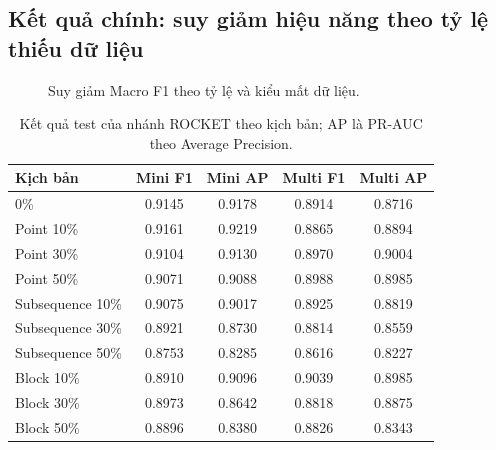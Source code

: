 \subsection{Kết quả chính: suy giảm hiệu năng theo tỷ lệ thiếu dữ liệu}
\label{sec:ket-qua-chinh}

\begin{figure}[H]
\centering
{}
\caption{Suy giảm Macro F1 theo tỷ lệ và kiểu mất dữ liệu.}
\label{fig:suy-giam-macro-f1}
\end{figure}


\begin{table}[H]
\centering
\small
\caption{Kết quả test của nhánh ROCKET theo kịch bản; AP là PR-AUC theo Average Precision.}
\label{tab:rocket-robust}
\begin{tabular}{@{}lcccc@{}}
\toprule
\textbf{Kịch bản} & \textbf{Mini F1} & \textbf{Mini AP} & \textbf{Multi F1} & \textbf{Multi AP} \\
\midrule
0\% & 0.9145 & 0.9178 & 0.8914 & 0.8716 \\
Point 10\% & 0.9161 & 0.9219 & 0.8865 & 0.8894 \\
Point 30\% & 0.9104 & 0.9130 & 0.8970 & 0.9004 \\
Point 50\% & 0.9071 & 0.9088 & 0.8988 & 0.8985 \\
Subsequence 10\% & 0.9075 & 0.9017 & 0.8925 & 0.8819 \\
Subsequence 30\% & 0.8921 & 0.8730 & 0.8814 & 0.8559 \\
Subsequence 50\% & 0.8753 & 0.8285 & 0.8616 & 0.8227 \\
Block 10\% & 0.8910 & 0.9096 & 0.9039 & 0.8985 \\
Block 30\% & 0.8973 & 0.8642 & 0.8818 & 0.8875 \\
Block 50\% & 0.8896 & 0.8380 & 0.8826 & 0.8343 \\
\bottomrule
\end{tabular}
\end{table}

